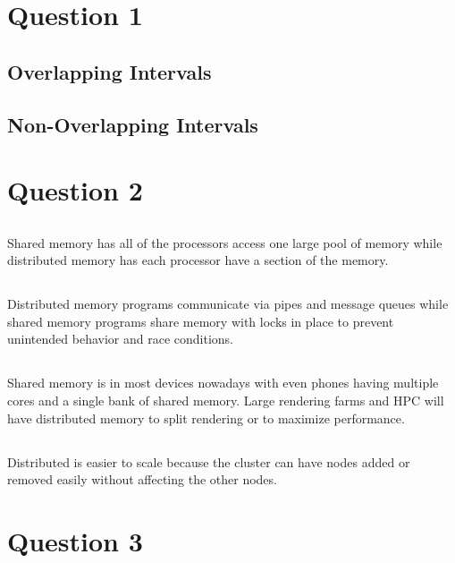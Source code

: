 \documentclass[12pt]{article}
\begin{document}
    \section{Question 1}
    \subsection{Overlapping Intervals}
    \subsection{Non-Overlapping Intervals}
    \section{Question 2}
    \subsection{}
    Shared memory has all of the processors access one large pool of memory while distributed memory has each processor have a section of the memory.
    \subsection{}
    Distributed memory programs communicate via pipes and message queues while shared memory programs share memory with locks in place to prevent unintended behavior and race conditions.
    \subsection{}
    Shared memory is in most devices nowadays with even phones having multiple cores and a single bank of shared memory. Large rendering farms and HPC will have distributed memory to split rendering or to maximize performance.
    \subsection{}
    Distributed is easier to scale because the cluster can have nodes added or removed easily without affecting the other nodes.
    \section{Question 3}
    
\end{document}
